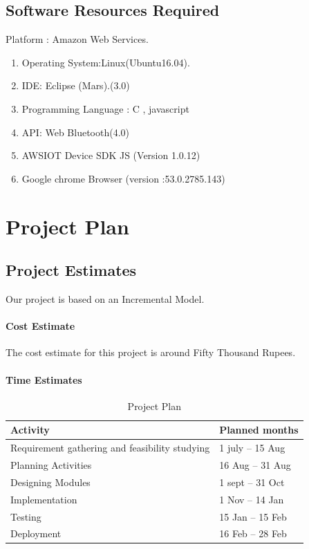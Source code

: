 \documentclass[oneside,a4paper,12pt]{report}
\begin{document}
\section{Software Resources Required}
Platform : Amazon Web Services.
\begin{enumerate}
\item Operating System:Linux(Ubuntu16.04). 
\item IDE: Eclipse (Mars).(3.0)
\item Programming Language : C , javascript
\item API: Web Bluetooth(4.0)
\item AWSIOT Device SDK JS (Version 1.0.12)
\item Google chrome Browser (version :53.0.2785.143)
\end{enumerate}




\chapter{Project Plan}

\section{Project Estimates}
 Our project is based on an Incremental Model. 
\subsubsection{Cost Estimate}
 The cost estimate for this project is around Fifty Thousand Rupees.

\subsubsection{Time Estimates}

\begin{table}[!htbp]
\begin{center}
\def\arraystretch{1.5}
\begin{tabularx}{\textwidth}{| X | X |}
\hline
Activity	& Planned months\\
\hline
Requirement gathering and feasibility studying        &1 july – 15 Aug\\
\hline
Planning Activities       &16 Aug – 31 Aug\\
\hline
Designing Modules        &1 sept – 31 Oct\\
\hline
Implementation           &1 Nov – 14 Jan\\
\hline
Testing                  &15 Jan – 15 Feb\\
\hline
Deployment               &16 Feb – 28 Feb\\
\hline



\end{tabularx}
\end{center}
\caption{Project Plan}
\label{tab:usecase}
\end{table}
\newpage
\end{document}
